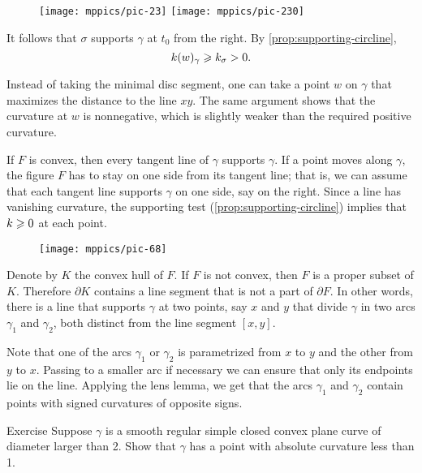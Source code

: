 {

\begin{wrapfigure}{l}{50 mm}
\vskip-2mm
\centering
\texttt{[image: mppics/pic-23]}
\bigskip
\texttt{[image: mppics/pic-230]}
\end{wrapfigure}

It follows that $\sigma$ supports $\gamma$ at $t_0$ from the right.
By \ref{prop:supporting-circline}, 
\[k(w)_\gamma\geqslant k_\sigma >0.\]
\qedsf

Instead of taking the minimal disc segment, one can take a point $w$ on $\gamma$ that maximizes the distance to the line $xy$.
The same argument shows that the curvature at $w$ is nonnegative, which is slightly weaker than the required positive curvature.

}

If $F$ is convex, then every tangent line of $\gamma$ supports $\gamma$.
If a point moves along $\gamma$, the figure $F$ has to stay on one side from its tangent line;
that is, we can assume that each tangent line supports $\gamma$ on one side, say on the right.
Since a line has vanishing curvature, the supporting test (\ref{prop:supporting-circline}) implies that $k\geqslant 0$ at each point.

\begin{wrapfigure}{r}{35 mm}
\vskip-3mm
\centering
\texttt{[image: mppics/pic-68]}
\vskip0mm
\end{wrapfigure}

Denote by $K$ the convex hull of $F$.
If $F$ is not convex, then $F$ is a proper subset of $K$.
Therefore $\partial K$ contains a line segment that is not a part of $\partial F$.
In other words, there is a line that supports $\gamma$ at two points, say $x$ and $y$ that divide $\gamma$ in two arcs $\gamma_1$ and $\gamma_2$, both distinct from the line segment $[x,y]$.

Note that one of the arcs $\gamma_1$ or $\gamma_2$ is parametrized from $x$ to $y$ and the other from $y$ to $x$.
Passing to a smaller arc if necessary we can ensure that only its endpoints lie on the line. 
Applying the lens lemma, we get that the arcs $\gamma_1$ and $\gamma_2$ contain points with signed curvatures of opposite signs.
\qeds

\begin{thm}{Exercise}\label{ex:convex small}
Suppose $\gamma$ is a smooth regular simple closed convex plane curve of diameter larger than 2.
Show that $\gamma$ has a point with absolute curvature less than 1.
\end{thm}

